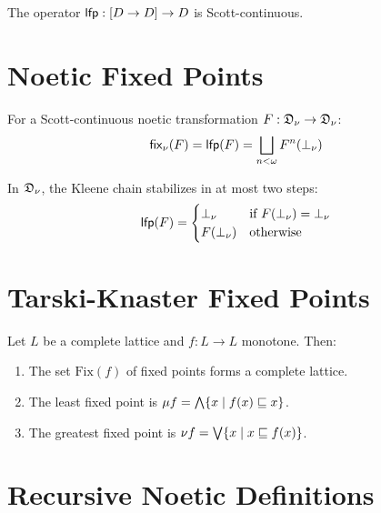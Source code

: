\begin{theorem}
\label{thm:lfp-continuous}
The operator $\mathsf{lfp} : [D \to D] \to D$ is Scott-continuous.
\end{theorem}

\section{Noetic Fixed Points}

\begin{definition}
\label{def:noetic-fixed-point}
For a Scott-continuous noetic transformation $F : \mathfrak{D}_\nu \to \mathfrak{D}_\nu$:
\[
\mathsf{fix}_\nu(F) = \mathsf{lfp}(F) = \bigsqcup_{n < \omega} F^n(\bot_\nu)
\]
\end{definition}

\begin{proposition}
\label{prop:flat-fixed-points}
In $\mathfrak{D}_\nu$, the Kleene chain stabilizes in at most two steps:
\[
\mathsf{lfp}(F) =
\begin{cases}
\bot_\nu & \text{if } F(\bot_\nu) = \bot_\nu \\
F(\bot_\nu) & \text{otherwise}
\end{cases}
\]
\end{proposition}

\section{Tarski-Knaster Fixed Points}

\begin{theorem}
\label{thm:tarski-knaster}
Let $L$ be a complete lattice and $f : L \to L$ monotone. Then:
\begin{enumerate}[label=(\roman*)]
  \item The set $\mathrm{Fix}(f)$ of fixed points forms a complete lattice.
  \item The least fixed point is $\mu f = \bigwedge\{x \mid f(x) \sqsubseteq x\}$.
  \item The greatest fixed point is $\nu f = \bigvee\{x \mid x \sqsubseteq f(x)\}$.
\end{enumerate}
\end{theorem}

\section{Recursive Noetic Definitions}


